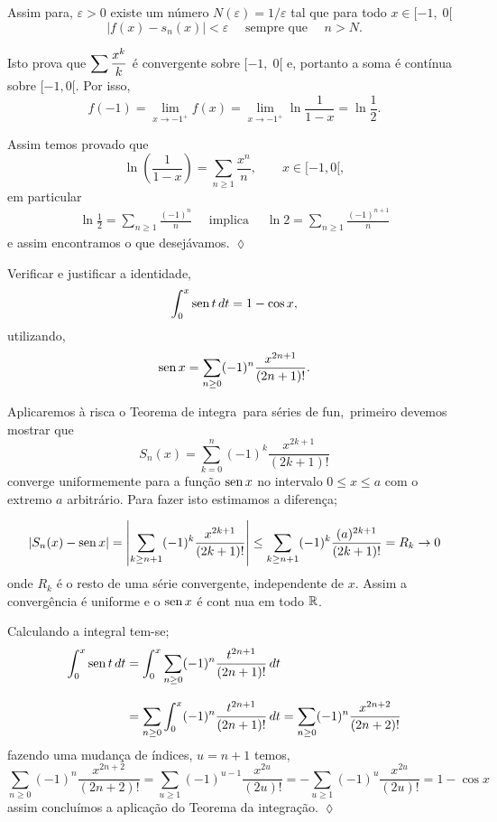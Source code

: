 Assim para, $\varepsilon>0$ existe um número
$N(\varepsilon)=1/\varepsilon$ tal que para todo $x\in [-1,\; 0[$
\begin{equation*}
    |f(x)-s_n(x)|<\varepsilon\quad\text{ sempre que }\quad n>N.
\end{equation*}

Isto prova que $\displaystyle{\sum \frac{x^k}{k}}$ é \unif convergente sobre
$[-1,\; 0[$ e, portanto a soma é contínua sobre $[-1,0[$. Por isso,
\begin{equation*}
    f(-1)=\lim_{x\to -1^+}f(x)=\lim_{x\to -1^+}\ln
    \frac{1}{1-x}=\ln\frac{1}{2}.
\end{equation*}

Assim temos provado que
\begin{equation*}
    \ln \left(\frac{1}{1-x}\right)=\sum_{n\ge 1}\frac{x^n}{n},\qquad x\in
    [-1,0[,
\end{equation*}
em particular
\begin{align*}
    \ln \frac{1}{2}=\sum_{n\ge 1}\frac{(-1)^n}{n}\quad\text{ implica }\quad \ln 2=\sum_{n\ge 1}\frac{(-1)^{n+1}}{n}
\end{align*}
e assim encontramos o que desejávamos. \hfill \(\lozenge\)

\begin{exer}
 Verificar e justificar  a identidade,
$$
\int_0^x \operatorname{sen} t\, dt =1-\cos x,
$$
utilizando,
$$
\operatorname{sen} x =\sum_{n\geq 0}(-1)^n\frac{x^{2n+1}}{(2n+1)!}.
$$
\end{exer}

\solo Aplicaremos à risca o Teorema de integra\cao\ para s\'eries
de fun\coes,\ primeiro devemos mostrar que
$$
S_n(x)=\sum_{k= 0}^{n}(-1)^k\frac{x^{2k+1}}{(2k+1)!}
$$
converge uniformemente para a função $\operatorname{sen} x$ no intervalo $0\leq
x \leq a$ com o extremo $a$ arbitr\'ario. Para fazer isto
estimamos a diferen\c ca;

\[|S_n(x)-\operatorname{sen} x|=\left|\sum_{k\geq
n+1}(-1)^k\frac{x^{2k+1}}{(2k+1)!}\right|\leq\sum_{k\geq
n+1}(-1)^k\frac{(a)^{2k+1}}{(2k+1)!}=R_k\to 0
\]
onde $R_k$ \'e o resto de uma s\'erie convergente, independente de
$x$. Assim a convergência \'e uniforme e o $\operatorname{sen} x$ \'e cont\ii
nua em todo $\mathbb{R}$.

Calculando a integral tem-se;
\begin{align*}
\int_0^x \operatorname{sen} t\, dt&=\int_0^x \sum_{n\geq
0}(-1)^n\frac{t^{2n+1}}{(2n+1)!}  \, dt\\[2ex]
&=\sum_{n\geq
0}\int_0^x(-1)^n\frac{t^{2n+1}}{(2n+1)!}\,dt=\sum_{n\geq
0}(-1)^n\frac{x^{2n+2}}{(2n+2)!}
\end{align*}
fazendo uma mudan\c ca de índices, $u=n+1$ temos, $$ \sum_{n\geq
0}(-1)^n\frac{x^{2n+2}}{(2n+2)!}=\sum_{u\geq
1}(-1)^{u-1}\frac{x^{2u}}{(2u)!}=-\sum_{u\geq
1}(-1)^{u}\frac{x^{2u}}{(2u)!}=1-\cos x $$ assim concluímos a
aplicação do Teorema da integração.  \hfill \(\lozenge\)

